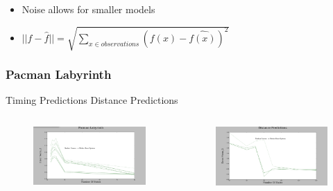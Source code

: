 \documentclass{beamer}
\begin{document}
\begin{frame}
\begin{columns}[c]
\end{columns}

\begin{itemize}
\item Noise allows for smaller models

\item $||f - \hat{f}|| = \sqrt{\sum\nolimits_{x \in observations}(f(x) - \hat{f(x)})^2}$ 
\end{itemize}

\end{frame}



\begin{frame}
\frametitle{Pacman Labyrinth}



\hspace{1cm} Timing Predictions
\hspace{3cm} Distance Predictions

\begin{columns}[c]

\begin{figure}
\includegraphics[width=1.0\linewidth]{lucasplots/monImages/PacmanLabyrinth.png}
\end{figure}


\begin{figure}
\includegraphics[width=1.0\linewidth]{lucasplots/monImages/Distance_Predictions.png}
\end{figure}


\end{columns}
\end{frame}
\end{document}
